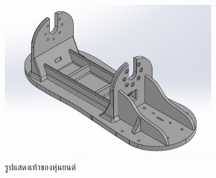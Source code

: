 \begin{figure}[!ht]
  \centering
  \begin{subfigure}[b]{0.55\linewidth}
    \includegraphics[width=\linewidth]{chapter4/images/foot_old.PNG}
    \caption{รูปแสดงเท้าของหุ่นยนต์}
  \end{subfigure}
  \begin{subfigure}[b]{0.2\linewidth}

\end{subfigure}
\end{figure}
